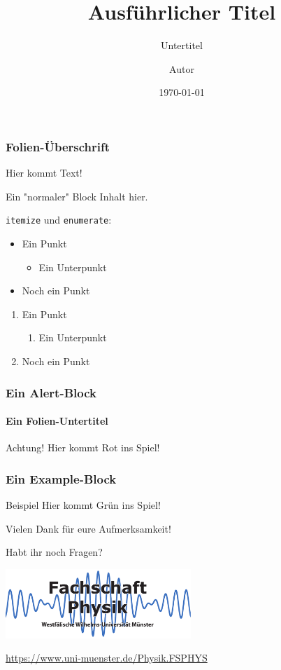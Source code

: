 \documentclass[german, ngerman]{beamer}
\title[Kurzer Titel]{Ausführlicher Titel}
\subtitle{Untertitel}
\author{Autor}
\institute{Fachschaft Physik}
\date{\today}
\begin{document}
\begin{frame}[plain]
	\titlepage
\end{frame}

\begin{frame}
	\frametitle{Folien-Überschrift}

	Hier kommt Text!

	\begin{block}{Ein "normaler" Block}
		Inhalt hier.
	\end{block}

	\texttt{itemize} und \texttt{enumerate}:
	\begin{itemize}
		\item Ein Punkt
		\begin{itemize}
			\item Ein Unterpunkt
		\end{itemize}
		\item Noch ein Punkt
	\end{itemize}
	\begin{enumerate}
		\item Ein Punkt
		\begin{enumerate}
			\item Ein Unterpunkt
		\end{enumerate}
		\item Noch ein Punkt
	\end{enumerate}
\end{frame}

\begin{frame}
	\frametitle{Ein Alert-Block}
	\framesubtitle{Ein Folien-Untertitel}

	\begin{alertblock}{Achtung!}
		Hier kommt Rot ins Spiel!
	\end{alertblock}
\end{frame}

\begin{frame}
	\frametitle{Ein Example-Block}

	\begin{exampleblock}{Beispiel}
		Hier kommt Grün ins Spiel!
	\end{exampleblock}
\end{frame}

\begin{frame}
	\begin{block}{}
		\centering
		Vielen Dank für eure Aufmerksamkeit!
	\end{block}

	\begin{block}{}
		\centering
		Habt ihr noch Fragen?
	\end{block}

	\begin{center}
		\includegraphics[width=7cm]{fsphys-logo.pdf}

		\medskip
		\url{https://www.uni-muenster.de/Physik.FSPHYS}
	\end{center}
\end{frame}
\end{document}
